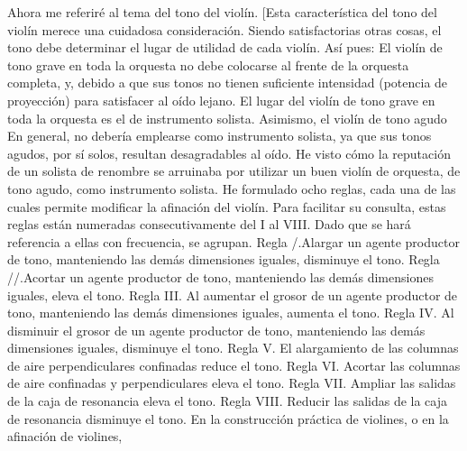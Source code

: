 Ahora me referiré al tema del tono del violín. [Esta característica del tono del violín merece una cuidadosa consideración. Siendo satisfactorias otras cosas, el tono debe determinar el lugar de utilidad de cada violín. Así pues: El violín de tono grave en toda la orquesta no debe colocarse al frente de la orquesta completa, y, debido a que sus tonos no tienen suficiente intensidad (potencia de proyección) para satisfacer al oído lejano. El lugar del violín de tono grave en toda la orquesta es el de instrumento solista. Asimismo, el violín de tono agudo
En general, no debería emplearse como instrumento solista, ya que sus tonos agudos, por sí solos, resultan desagradables al oído. He visto cómo la reputación de un solista de renombre se arruinaba por utilizar un buen violín de orquesta, de tono agudo, como instrumento solista.
He formulado ocho reglas, cada una de las cuales permite modificar la afinación del violín. Para facilitar su consulta, estas reglas están numeradas consecutivamente del I al VIII. Dado que se hará referencia a ellas con frecuencia, se agrupan.
Regla /.Alargar un agente productor de tono, manteniendo las demás dimensiones iguales, disminuye el tono.
Regla //.Acortar un agente productor de tono, manteniendo las demás dimensiones iguales, eleva el tono.
Regla III. Al aumentar el grosor de un agente productor de tono, manteniendo las demás dimensiones iguales, aumenta el tono.
Regla IV. Al disminuir el grosor de un agente productor de tono, manteniendo las demás dimensiones iguales, disminuye el tono.
Regla V. El alargamiento de las columnas de aire perpendiculares confinadas reduce el tono.
Regla VI. Acortar las columnas de aire confinadas y perpendiculares eleva el tono. 
Regla VII. Ampliar las salidas de la caja de resonancia eleva el tono. 
Regla VIII. Reducir las salidas de la caja de resonancia disminuye el tono.
En la construcción práctica de violines, o en la afinación de violines,
\label{plancha_fondo}

